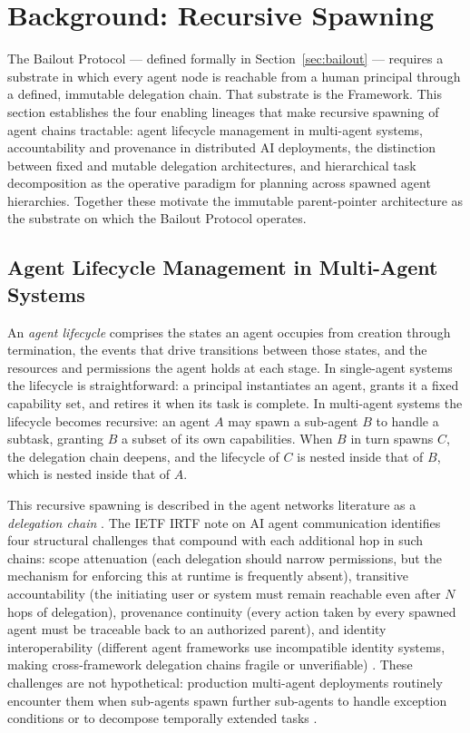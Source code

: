 \section{Background: Recursive Spawning}
\label{sec:background-recursive-spawning}

The Bailout Protocol — defined formally in Section~\ref{sec:bailout} — requires a substrate in which every agent node is reachable from a human principal through a defined, immutable delegation chain. That substrate is the \bxthree{} Framework. This section establishes the four enabling lineages that make recursive spawning of agent chains tractable: agent lifecycle management in multi-agent systems, accountability and provenance in distributed AI deployments, the distinction between fixed and mutable delegation architectures, and hierarchical task decomposition as the operative paradigm for planning across spawned agent hierarchies. Together these motivate the \bxthree{} immutable parent-pointer architecture as the substrate on which the Bailout Protocol operates.

\subsection{Agent Lifecycle Management in Multi-Agent Systems}
\label{sec:lifecycle}

An \emph{agent lifecycle} comprises the states an agent occupies from creation through termination, the events that drive transitions between those states, and the resources and permissions the agent holds at each stage. In single-agent systems the lifecycle is straightforward: a principal instantiates an agent, grants it a fixed capability set, and retires it when its task is complete. In multi-agent systems the lifecycle becomes recursive: an agent $A$ may spawn a sub-agent $B$ to handle a subtask, granting $B$ a subset of its own capabilities. When $B$ in turn spawns $C$, the delegation chain deepens, and the lifecycle of $C$ is nested inside that of $B$, which is nested inside that of $A$.

This recursive spawning is described in the agent networks literature as a \emph{delegation chain} \cite{ietf-irtf-agent-delegation}. The IETF IRTF note on AI agent communication identifies four structural challenges that compound with each additional hop in such chains: scope attenuation (each delegation should narrow permissions, but the mechanism for enforcing this at runtime is frequently absent), transitive accountability (the initiating user or system must remain reachable even after $N$ hops of delegation), provenance continuity (every action taken by every spawned agent must be traceable back to an authorized parent), and identity interoperability (different agent frameworks use incompatible identity systems, making cross-framework delegation chains fragile or unverifiable) \cite{ietf-irtf-agent-delegation}. These challenges are not hypothetical: production multi-agent deployments routinely encounter them when sub-agents spawn further sub-agents to handle exception conditions or to decompose temporally extended tasks \cite{csa-delegation, dynamiq-multiagent}.

